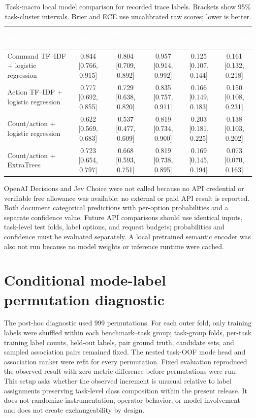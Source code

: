 \begin{table}[tb]
\centering
\caption{Task-macro local model comparison for recorded trace labels. Brackets show 95\% task-cluster intervals. Brier and ECE use uncalibrated raw scores; lower is better.}
\label{tab:local-model-comparison}
\scriptsize
\setlength{\tabcolsep}{3pt}
\begin{tabularx}{\linewidth}{>{\raggedright\arraybackslash}Xccccc}
\toprule
\rowcolor{TableInk}
\textcolor{white}{Model} & \textcolor{white}{BAcc} & \textcolor{white}{Macro-F1} & \textcolor{white}{ROC-AUC} & \textcolor{white}{Brier} & \textcolor{white}{ECE-10} \\
\midrule
Command TF--IDF + logistic regression & 0.844 [0.766, 0.915] & 0.804 [0.709, 0.892] & 0.957 [0.914, 0.992] & 0.125 [0.107, 0.144] & 0.161 [0.132, 0.218] \\
Action TF--IDF + logistic regression & 0.777 [0.692, 0.855] & 0.729 [0.638, 0.820] & 0.835 [0.757, 0.911] & 0.166 [0.149, 0.183] & 0.150 [0.108, 0.231] \\
Count/action + logistic regression & 0.622 [0.569, 0.683] & 0.537 [0.477, 0.609] & 0.819 [0.734, 0.900] & 0.203 [0.181, 0.225] & 0.138 [0.103, 0.202] \\
Count/action + ExtraTrees & 0.723 [0.654, 0.797] & 0.668 [0.593, 0.751] & 0.819 [0.738, 0.895] & 0.169 [0.145, 0.194] & 0.073 [0.070, 0.163] \\
\bottomrule
\end{tabularx}
\end{table}

OpenAI Decisions and Jev Choice were not called because no API credential or verifiable free allowance was available; no external or paid API result is reported. Both document categorical predictions with per-option probabilities and a separate confidence value. Future API comparisons should use identical inputs, task-level test folds, label options, and request budgets; probabilities and confidence must be evaluated separately. A local pretrained semantic encoder was also not run because no model weights or inference runtime were cached.

\section{Conditional mode-label permutation diagnostic}
\label{app:permutation}

The post-hoc diagnostic used 999 permutations. For each outer fold, only training labels were shuffled within each benchmark--task group; task-group folds, per-task training label counts, held-out labels, pair ground truth, candidate sets, and sampled association pairs remained fixed. The nested task-OOF mode head and association ranker were refit for every permutation. Fixed evaluation reproduced the observed result with zero metric difference before permutations were run. This setup asks whether the observed increment is unusual relative to label assignments preserving task-level class composition within the present release. It does not randomize instrumentation, operator behavior, or model involvement and does not create exchangeability by design.

